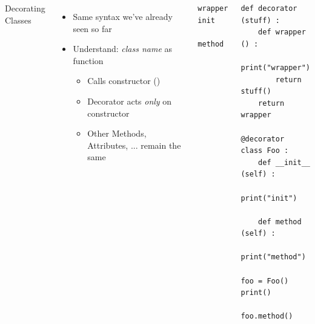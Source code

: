 \begin{frame}[fragile]
%
\begin{columns}[T]
\begin{Large}
	{Decorating Classes}
	\vspace{12pt}
\end{Large}
%
\begin{itemize}
\item Same syntax we've already seen so far
\item Understand: \emph{class name} as function
	\begin{itemize}
	\item Calls constructor (\ie {})
	\item[\Thus] Decorator acts \emph{only} on constructor
	\item[\Thus] Other Methods, Attributes, ... remain the same
	\end{itemize}
\end{itemize}
%
\vspace{27pt}
\begin{cmdbox}
\begin{verbatim}
wrapper
init

method
\end{verbatim}
\end{cmdbox}
%
\begin{codebox}
\begin{verbatim}
def decorator (stuff) :
    def wrapper () :
        print("wrapper")
        return stuff()
    return wrapper
        
@decorator
class Foo :
    def __init__ (self) :
        print("init")
        
    def method (self) :
        print("method")

foo = Foo()
print()

foo.method()
\end{verbatim}
\end{codebox}
\end{columns}
%
\end{frame}


